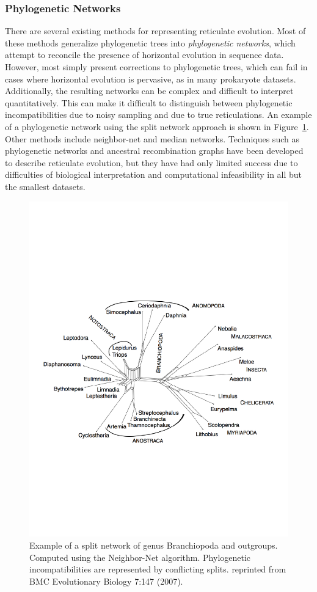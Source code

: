 \subsubsection{Phylogenetic Networks}
\label{bg:bio:phylo:networks}

There are several existing methods for representing reticulate evolution.
Most of these methods generalize phylogenetic trees into \emph{phylogenetic networks}, which attempt to reconcile the presence of horizontal evolution in sequence data.
However, most simply present corrections to phylogenetic trees, which can fail in cases where horizontal evolution is pervasive, as in many prokaryote datasets.
Additionally, the resulting networks can be complex and difficult to interpret quantitatively.
This can make it difficult to distinguish between phylogenetic incompatibilities due to noisy sampling and due to true reticulations.
An example of a phylogenetic network using the split network approach is shown in Figure~\ref{fig:bg:split_network}.
Other methods include neighbor-net and median networks.
Techniques such as phylogenetic networks and ancestral recombination graphs have been developed to describe reticulate evolution, but they have had only limited success due to difficulties of biological interpretation and computational infeasibility in all but the smallest datasets.

\begin{figure}
\centering
\includegraphics[width=.8\textwidth]{fig/background/split_network.pdf}
\caption[Example of a Splits Network]{Example of a split network of genus Branchiopoda and outgroups. Computed using the Neighbor-Net algorithm. Phylogenetic incompatibilities are represented by conflicting splits. reprinted from BMC Evolutionary Biology 7:147 (2007).}
\label{fig:bg:split_network}
\end{figure}

